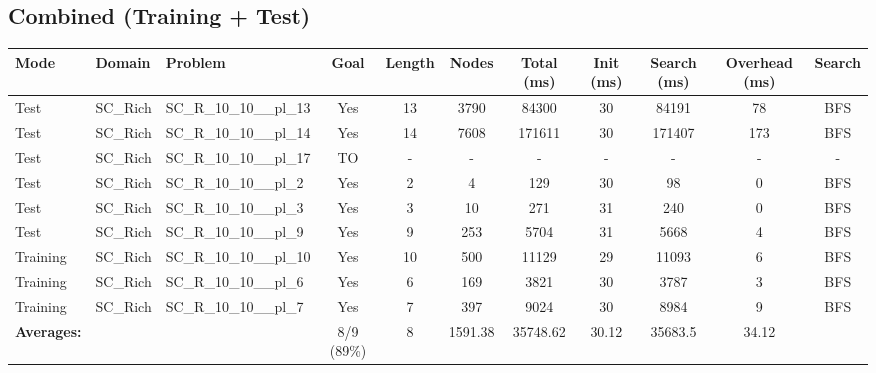 \documentclass{article}
\begin{document}
\subsection*{Combined (Training + Test)}
\begin{tabular}{lllcccccccc}
\toprule
Mode & Domain & Problem & Goal & Length & Nodes & Total (ms) & Init (ms) & Search (ms) & Overhead (ms) & Search \\
\midrule
Test & SC\_Rich & SC\_R\_10\_10\_\_pl\_13 & Yes & 13 & 3790 & 84300 & 30 & 84191 & 78 & BFS \\
Test & SC\_Rich & SC\_R\_10\_10\_\_pl\_14 & Yes & 14 & 7608 & 171611 & 30 & 171407 & 173 & BFS \\
Test & SC\_Rich & SC\_R\_10\_10\_\_pl\_17 & TO & - & - & - & - & - & - & - \\
Test & SC\_Rich & SC\_R\_10\_10\_\_pl\_2 & Yes & 2 & 4 & 129 & 30 & 98 & 0 & BFS \\
Test & SC\_Rich & SC\_R\_10\_10\_\_pl\_3 & Yes & 3 & 10 & 271 & 31 & 240 & 0 & BFS \\
Test & SC\_Rich & SC\_R\_10\_10\_\_pl\_9 & Yes & 9 & 253 & 5704 & 31 & 5668 & 4 & BFS \\
Training & SC\_Rich & SC\_R\_10\_10\_\_pl\_10 & Yes & 10 & 500 & 11129 & 29 & 11093 & 6 & BFS \\
Training & SC\_Rich & SC\_R\_10\_10\_\_pl\_6 & Yes & 6 & 169 & 3821 & 30 & 3787 & 3 & BFS \\
Training & SC\_Rich & SC\_R\_10\_10\_\_pl\_7 & Yes & 7 & 397 & 9024 & 30 & 8984 & 9 & BFS \\
\textbf{Averages:} & & & 8/9 (89\%) & 8 & 1591.38 & 35748.62 & 30.12 & 35683.5 & 34.12 & \\
\bottomrule
\end{tabular}
\newpage
\end{document}
